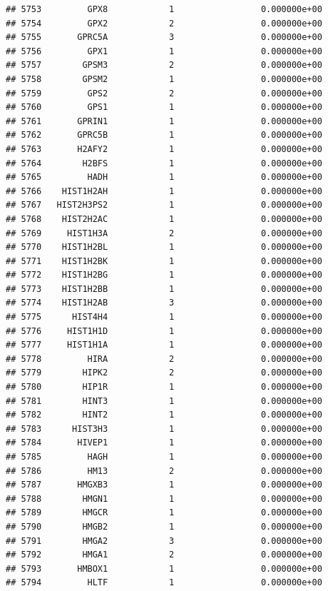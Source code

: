 \documentclass[
]{article}
\begin{document}
\begin{verbatim}
## 5753         GPX8            1                 0.000000e+00
## 5754         GPX2            2                 0.000000e+00
## 5755       GPRC5A            3                 0.000000e+00
## 5756         GPX1            1                 0.000000e+00
## 5757        GPSM3            2                 0.000000e+00
## 5758        GPSM2            1                 0.000000e+00
## 5759         GPS2            2                 0.000000e+00
## 5760         GPS1            1                 0.000000e+00
## 5761       GPRIN1            1                 0.000000e+00
## 5762       GPRC5B            1                 0.000000e+00
## 5763       H2AFY2            1                 0.000000e+00
## 5764        H2BFS            1                 0.000000e+00
## 5765         HADH            1                 0.000000e+00
## 5766    HIST1H2AH            1                 0.000000e+00
## 5767   HIST2H3PS2            1                 0.000000e+00
## 5768    HIST2H2AC            1                 0.000000e+00
## 5769     HIST1H3A            2                 0.000000e+00
## 5770    HIST1H2BL            1                 0.000000e+00
## 5771    HIST1H2BK            1                 0.000000e+00
## 5772    HIST1H2BG            1                 0.000000e+00
## 5773    HIST1H2BB            1                 0.000000e+00
## 5774    HIST1H2AB            3                 0.000000e+00
## 5775      HIST4H4            1                 0.000000e+00
## 5776     HIST1H1D            1                 0.000000e+00
## 5777     HIST1H1A            1                 0.000000e+00
## 5778         HIRA            2                 0.000000e+00
## 5779        HIPK2            2                 0.000000e+00
## 5780        HIP1R            1                 0.000000e+00
## 5781        HINT3            1                 0.000000e+00
## 5782        HINT2            1                 0.000000e+00
## 5783      HIST3H3            1                 0.000000e+00
## 5784       HIVEP1            1                 0.000000e+00
## 5785         HAGH            1                 0.000000e+00
## 5786         HM13            2                 0.000000e+00
## 5787       HMGXB3            1                 0.000000e+00
## 5788        HMGN1            1                 0.000000e+00
## 5789        HMGCR            1                 0.000000e+00
## 5790        HMGB2            1                 0.000000e+00
## 5791        HMGA2            3                 0.000000e+00
## 5792        HMGA1            2                 0.000000e+00
## 5793       HMBOX1            1                 0.000000e+00
## 5794         HLTF            1                 0.000000e+00

\end{verbatim}
\end{document}
